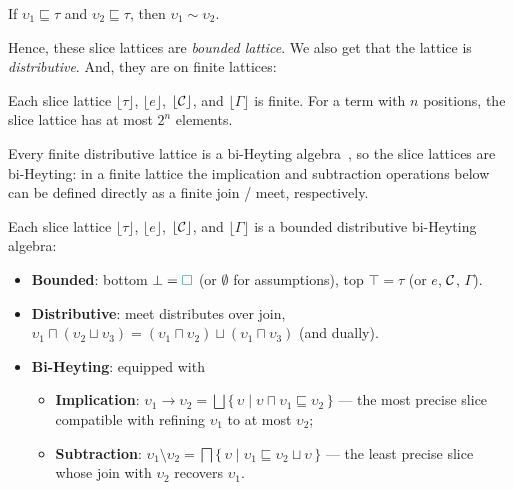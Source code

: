 \begin{lemma}\label{lem:slices-consistent}
If\/ $\upsilon_1 \sqsubseteq \tau$ and $\upsilon_2 \sqsubseteq \tau$, then $\upsilon_1 \sim \upsilon_2$.
\end{lemma}

Hence, these slice lattices are \textit{bounded lattice}. We also get that the lattice is \textit{distributive}. And, they are on finite lattices:

\begin{theorem}\label{thm:slice-finite}
Each slice lattice $\lfloor\tau\rfloor$, $\lfloor e \rfloor$, $\lfloor \mathcal{C} \rfloor$, and $\lfloor \Gamma \rfloor$ is finite. For a term with $n$ positions, the slice lattice has at most $2^n$ elements.
\end{theorem}

Every finite distributive lattice is a bi-Heyting algebra~\cite{DaveyPriestley}, so the slice lattices are bi-Heyting: in a finite lattice the implication and subtraction operations below can be defined directly as a finite join / meet, respectively.

\begin{majortheorembox}
%
\begin{theorem}\label{thm:slice-lattices}
Each slice lattice $\lfloor\tau\rfloor$, $\lfloor e \rfloor$, $\lfloor \mathcal{C} \rfloor$, and $\lfloor \Gamma \rfloor$ is a bounded distributive bi-Heyting algebra:
\begin{itemize}
\item \yo \textbf{Bounded}: bottom $\bot = {\color{teal}\Box}$ (or $\emptyset$ for assumptions), top $\top = \tau$ (or $e$, $\mathcal{C}$, $\Gamma$).
\item \yo \textbf{Distributive}: meet distributes over join, $\upsilon_1 \sqcap (\upsilon_2 \sqcup \upsilon_3) = (\upsilon_1 \sqcap \upsilon_2) \sqcup (\upsilon_1 \sqcap \upsilon_3)$ (and dually).
\item \textbf{Bi-Heyting}: equipped with
\begin{itemize}
\item \po \textbf{Implication}: $\upsilon_1 \to \upsilon_2 = \bigsqcup\{\,\upsilon \mid \upsilon \sqcap \upsilon_1 \sqsubseteq \upsilon_2\,\}$ --- the most precise slice compatible with refining $\upsilon_1$ to at most $\upsilon_2$;
\item \po \textbf{Subtraction}: $\upsilon_1 \setminus \upsilon_2 = \bigsqcap\{\,\upsilon \mid \upsilon_1 \sqsubseteq \upsilon_2 \sqcup \upsilon\,\}$ --- the least precise slice whose join with $\upsilon_2$ recovers $\upsilon_1$.
\end{itemize}
\end{itemize}
\end{theorem}
\end{majortheorembox}

